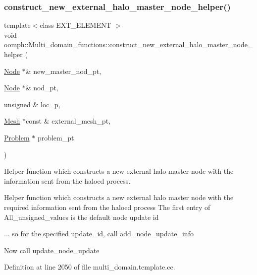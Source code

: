 \subsubsection{\texorpdfstring{construct\+\_\+new\+\_\+external\+\_\+halo\+\_\+master\+\_\+node\+\_\+helper()}{construct\_new\_external\_halo\_master\_node\_helper()}}
{\footnotesize\ttfamily template$<$class E\+X\+T\+\_\+\+E\+L\+E\+M\+E\+NT $>$ \\
void oomph\+::\+Multi\+\_\+domain\+\_\+functions\+::construct\+\_\+new\+\_\+external\+\_\+halo\+\_\+master\+\_\+node\+\_\+helper (\begin{DoxyParamCaption}\item[{\hyperlink{classoomph_1_1Node}{Node} $\ast$\&}]{new\+\_\+master\+\_\+nod\+\_\+pt,  }\item[{\hyperlink{classoomph_1_1Node}{Node} $\ast$\&}]{nod\+\_\+pt,  }\item[{unsigned \&}]{loc\+\_\+p,  }\item[{\hyperlink{classoomph_1_1Mesh}{Mesh} $\ast$const \&}]{external\+\_\+mesh\+\_\+pt,  }\item[{\hyperlink{classoomph_1_1Problem}{Problem} $\ast$}]{problem\+\_\+pt }\end{DoxyParamCaption})}



Helper function which constructs a new external halo master node with the information sent from the haloed process. 

Helper function which constructs a new external halo master node with the required information sent from the haloed process The first entry of All\+\_\+unsigned\+\_\+values is the default node update id

... so for the specified update\+\_\+id, call add\+\_\+node\+\_\+update\+\_\+info

Now call update\+\_\+node\+\_\+update 

Definition at line 2050 of file multi\+\_\+domain.\+template.\+cc.



